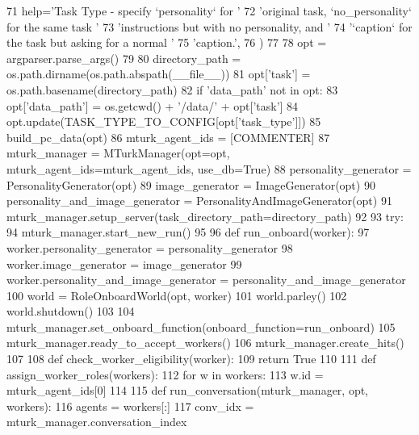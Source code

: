 \begin{DoxyCode}
71         help=\textcolor{stringliteral}{'Task Type - specify `personality` for '}
72         \textcolor{stringliteral}{'original task, `no\_personality` for the same task '}
73         \textcolor{stringliteral}{'instructions but with no personality, and '}
74         \textcolor{stringliteral}{'`caption` for the task but asking for a normal '}
75         \textcolor{stringliteral}{'caption.'},
76     )
77 
78     opt = argparser.parse\_args()
79 
80     directory\_path = os.path.dirname(os.path.abspath(\_\_file\_\_))
81     opt[\textcolor{stringliteral}{'task'}] = os.path.basename(directory\_path)
82     \textcolor{keywordflow}{if} \textcolor{stringliteral}{'data\_path'} \textcolor{keywordflow}{not} \textcolor{keywordflow}{in} opt:
83         opt[\textcolor{stringliteral}{'data\_path'}] = os.getcwd() + \textcolor{stringliteral}{'/data/'} + opt[\textcolor{stringliteral}{'task'}]
84     opt.update(TASK\_TYPE\_TO\_CONFIG[opt[\textcolor{stringliteral}{'task\_type'}]])
85     build\_pc\_data(opt)
86     mturk\_agent\_ids = [COMMENTER]
87     mturk\_manager = MTurkManager(opt=opt, mturk\_agent\_ids=mturk\_agent\_ids, use\_db=\textcolor{keyword}{True})
88     personality\_generator = PersonalityGenerator(opt)
89     image\_generator = ImageGenerator(opt)
90     personality\_and\_image\_generator = PersonalityAndImageGenerator(opt)
91     mturk\_manager.setup\_server(task\_directory\_path=directory\_path)
92 
93     \textcolor{keywordflow}{try}:
94         mturk\_manager.start\_new\_run()
95 
96         \textcolor{keyword}{def }run\_onboard(worker):
97             worker.personality\_generator = personality\_generator
98             worker.image\_generator = image\_generator
99             worker.personality\_and\_image\_generator = personality\_and\_image\_generator
100             world = RoleOnboardWorld(opt, worker)
101             world.parley()
102             world.shutdown()
103 
104         mturk\_manager.set\_onboard\_function(onboard\_function=run\_onboard)
105         mturk\_manager.ready\_to\_accept\_workers()
106         mturk\_manager.create\_hits()
107 
108         \textcolor{keyword}{def }check\_worker\_eligibility(worker):
109             \textcolor{keywordflow}{return} \textcolor{keyword}{True}
110 
111         \textcolor{keyword}{def }assign\_worker\_roles(workers):
112             \textcolor{keywordflow}{for} w \textcolor{keywordflow}{in} workers:
113                 w.id = mturk\_agent\_ids[0]
114 
115         \textcolor{keyword}{def }run\_conversation(mturk\_manager, opt, workers):
116             agents = workers[:]
117             conv\_idx = mturk\_manager.conversation\_index

\end{DoxyCode}
